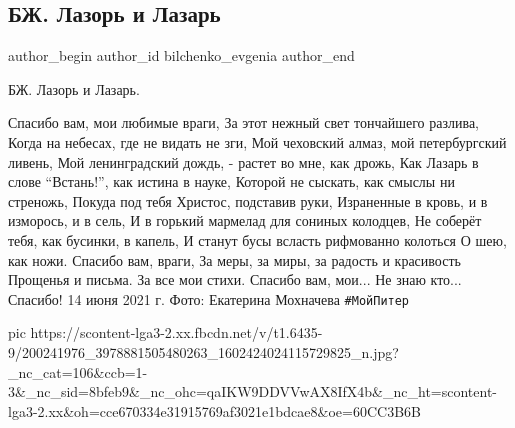  
 
 
 
 
 
\subsection{БЖ. Лазорь и Лазарь}
\label{sec:14_06_2021.fb.bilchenko_evgenia.1.lazor_i_lazar}
\ifcmt
 author_begin
   author_id bilchenko_evgenia
 author_end
\fi

БЖ. Лазорь и Лазарь.

Спасибо вам, мои любимые враги, 
За этот нежный свет тончайшего разлива,
Когда на небесах, где не видать не зги,
Мой чеховский алмаз, мой петербургский ливень,
Мой ленинградский дождь, - растет во мне, как дрожь,
Как Лазарь в слове \enquote{Встань!}, как истина в науке,
Которой не сыскать, как смыслы ни стреножь,
Покуда под тебя Христос, подставив руки,
Израненные в кровь, и в изморось, и в сель,
И в горький мармелад для сониных колодцев,
Не соберёт тебя, как бусинки, в капель,
И станут бусы всласть рифмованно колоться
О шею, как ножи. Спасибо вам, враги,
За меры, за миры, за радость и красивость
Прощенья и письма. За все мои стихи.
Спасибо вам, мои... Не знаю кто... 
Спасибо!
14 июня 2021 г.
Фото: Екатерина Мохначева \verb|#МойПитер|

\ifcmt
  pic https://scontent-lga3-2.xx.fbcdn.net/v/t1.6435-9/200241976_3978881505480263_1602424024115729825_n.jpg?_nc_cat=106&ccb=1-3&_nc_sid=8bfeb9&_nc_ohc=qaIKW9DDVVwAX8IfX4b&_nc_ht=scontent-lga3-2.xx&oh=cce670334e31915769af3021e1bdcae8&oe=60CC3B6B
\fi
